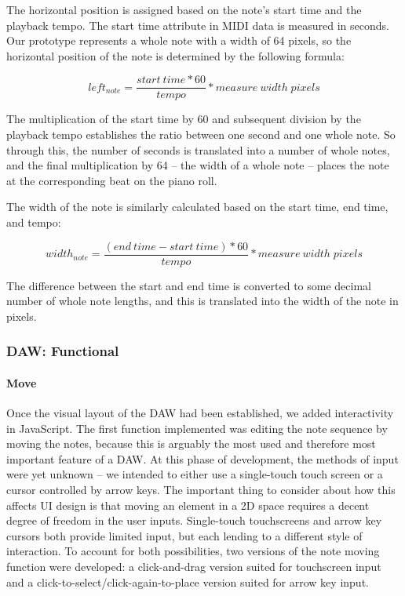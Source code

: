 The horizontal position is assigned based on the note's start time and the playback tempo. The
start time attribute in MIDI data is measured in seconds. Our prototype represents a whole note
with a width of 64 pixels, so the horizontal position of the note is determined by the following
formula:

\begin{equation} \label{note_vert}
  left_{note} = \frac{start\:time * 60}{tempo} * measure\:width\;pixels
\end{equation}

The multiplication of the start time by 60 and subsequent division by the playback tempo
establishes the ratio between one second and one whole note. So through this, the number of
seconds is translated into a number of whole notes, and the final multiplication by 64 -- the width
of a whole note -- places the note at the corresponding beat on the piano roll.

The width of the note is similarly calculated based on the start time, end time, and tempo:

\begin{equation} \label{note_vert}
  width_{note} = \frac{(end\:time - start\:time) * 60}{tempo} * measure\:width\;pixels
\end{equation}

The difference between the start and end time is converted to some decimal number of whole note
lengths, and this is translated into the width of the note in pixels.

\subsubsection{DAW: Functional}

\paragraph{Move}

Once the visual layout of the DAW had been established, we added interactivity in JavaScript. The
first function implemented was editing the note sequence by moving the notes, because this is
arguably the most used and therefore most important feature of a DAW. At this phase of development,
the methods of input were yet unknown -- we intended to either use a single-touch touch screen or a
cursor controlled by arrow keys. The important thing to consider about how this affects UI design
is that moving an element in a 2D space requires a decent degree of freedom in the user inputs.
Single-touch touchscreens and arrow key cursors both provide limited input, but each lending to a
different style of interaction. To account for both possibilities, two versions of the note moving
function were developed: a click-and-drag version suited for touchscreen input and a
click-to-select/click-again-to-place version suited for arrow key input.

